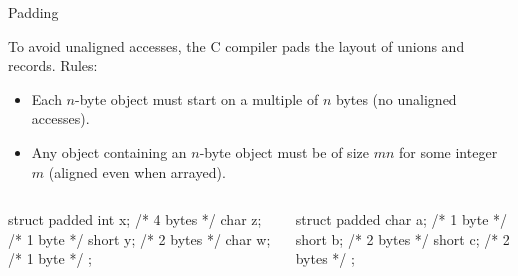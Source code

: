 \documentclass{plt}
\begin{document}
\begin{frame}[fragile]{Padding}
\small

To avoid unaligned accesses, the C compiler pads the layout of unions
and records. Rules:

\begin{itemize}
  \item Each $n$-byte object must start on a multiple of $n$ bytes (no
    unaligned accesses).

   \item Any object containing an $n$-byte object must be of size $mn$ for some
     integer $m$ (aligned even when arrayed).
\end{itemize}

\begin{columns}
\begin{column}[t]{0.5\textwidth}
\begin{C}
struct padded {
  int x;   /* 4 bytes */
  char z;  /* 1 byte  */
  short y; /* 2 bytes */
  char w;  /* 1 byte  */
};
\end{C}

  \end{column}
  \begin{column}[t]{0.5\textwidth}
\begin{C}
struct padded {
  char a;  /* 1 byte  */
  short b; /* 2 bytes */
  short c; /* 2 bytes */
};
\end{C}

  \end{column}
\end{columns}

\end{frame}
\end{document}
